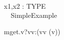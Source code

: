 \begin{circus}%
[TYPE]\\
\circchannel x1,x2 : TYPE\\
 \circprocess\ ~SimpleExample ~\circdef~\circbegin



  \circspot
            mget.v?vv:(vv \in \delta(v)) \then \Skip
  \circend
\end{circus}
